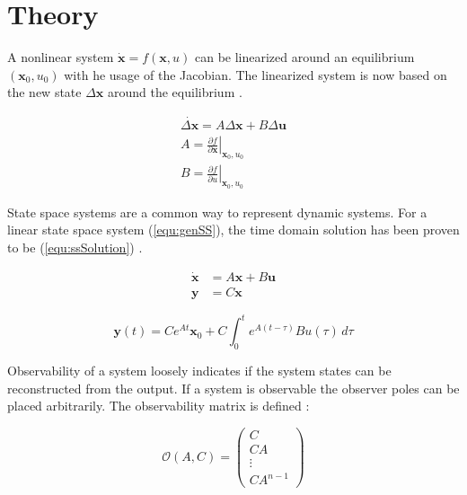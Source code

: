 \documentclass[a4paper, titlepage]{article}
\begin{document}
\section{Theory}
A nonlinear system $\dot{\textbf{x}} = f(\textbf{x},u)$ can be linearized around an equilibrium $(\textbf{x}_0, u_0)$ with he usage of the Jacobian. 
The linearized system is now based on the new state $\Delta \textbf{x}$ around the equilibrium \citep[~p.204]{astrom21}.

\begin{equation}
\begin{split}
\dot{\Delta \textbf{x}} = A \Delta \textbf{x} + B \Delta \textbf{u} \\
A = \left.\frac{\partial f}{\partial \textbf{x}}\right|_{\textbf{x}_0, u_0} \\
B = \left.\frac{\partial f}{\partial u}\right|_{\textbf{x}_0, u_0}
\end{split}
\end{equation}

State space systems are a common way to represent dynamic systems.
For a linear state space system (\ref{equ:genSS}), the time domain solution has been proven to be (\ref{equ:ssSolution}) \citep[~p.189]{astrom21}.

\begin{equation}
\begin{split}
\dot{\textbf{x}} &= A\textbf{x} + B\textbf{u} \\
\textbf{y} &= C\textbf{x}
\end{split}
\label{equ:genSS}
\end{equation}

\begin{equation}
\textbf{y}(t) = Ce^{At}\textbf{x}_0 + C \int_{0}^{t} e^{A(t-\tau)}Bu(\tau) \,d\tau
\label{equ:ssSolution}
\end{equation}

Observability of a system loosely indicates if the system states can be reconstructed from the output. If a system is observable the observer poles can be placed arbitrarily.
The observability matrix is defined \citep[p.~45]{glad00}:

\begin{equation}
\mathcal{O}(A,C) = 
\begin{pmatrix}
C \\ CA \\ \vdots \\ CA^{n-1}
\end{pmatrix}
\label{equ:obsv}
\end{equation}
\end{document}
